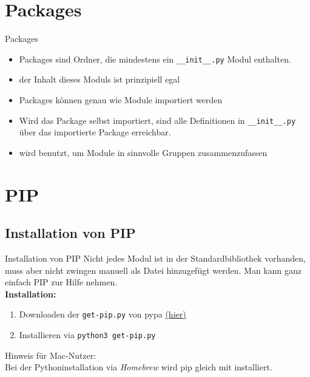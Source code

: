 
\section{Packages}
\begin{frame}{Packages}
	\begin{itemize}
		\item Packages sind Ordner, die mindestens ein \alert{\texttt{\_\_init\_\_.py}} Modul enthalten.
		\item der Inhalt dieses Moduls ist prinzipiell egal
		\item Packages k\"onnen genau wie Module importiert werden
		\item Wird das Package selbst importiert, sind alle Definitionen in \texttt{\_\_init\_\_.py} \"uber das importierte Package erreichbar.
		\item wird benutzt, um Module in sinnvolle Gruppen zusammenzufassen
	\end{itemize}
\end{frame}


\section{PIP}
\subsection{Installation von PIP}
\begin{frame}{Installation von PIP}
	Nicht jedes Modul ist in der Standardbibliothek vorhanden, muss aber nicht zwingen manuell als Datei hinzugef\"ugt werden. Man kann ganz einfach PIP zur Hilfe nehmen.\\[.5cm]
	\textbf{Installation:}\\
	\begin{enumerate}
		\item Downloaden der \texttt{get-pip.py} von pypa \href{https://bootstrap.pypa.io/get-pip.py}{(hier)}
		\item Installieren via \texttt{python3 get-pip.py}\\[.5cm]
	\end{enumerate}

	Hinweis f\"ur Mac-Nutzer:\\
	Bei der Pythoninstallation via \textit{Homebrew} wird pip gleich mit installiert.
\end{frame}



